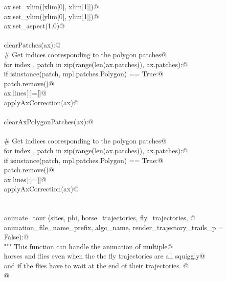 \documentclass[12.0pt]{report}
\begin{document}
\begin{appendices}
\begin{flushleft}
\begin{list}{}{}
\mbox{}\verb@      ax.set_xlim([xlim[0], xlim[1]])@\\
\mbox{}\verb@      ax.set_ylim([ylim[0], ylim[1]])@\\
\mbox{}\verb@      ax.set_aspect(1.0)@\\
\mbox{}\verb@@\\
\mbox{}\verb@def clearPatches(ax):@\\
\mbox{}\verb@    # Get indices cooresponding to the polygon patches@\\
\mbox{}\verb@    for index , patch in zip(range(len(ax.patches)), ax.patches):@\\
\mbox{}\verb@        if isinstance(patch, mpl.patches.Polygon) == True:@\\
\mbox{}\verb@            patch.remove()@\\
\mbox{}\verb@    ax.lines[:]=[]@\\
\mbox{}\verb@    applyAxCorrection(ax)@\\
\mbox{}\verb@@\\
\mbox{}\verb@def clearAxPolygonPatches(ax):@\\
\mbox{}\verb@@\\
\mbox{}\verb@    # Get indices cooresponding to the polygon patches@\\
\mbox{}\verb@    for index , patch in zip(range(len(ax.patches)), ax.patches):@\\
\mbox{}\verb@        if isinstance(patch, mpl.patches.Polygon) == True:@\\
\mbox{}\verb@            patch.remove()@\\
\mbox{}\verb@    ax.lines[:]=[]@\\
\mbox{}\verb@    applyAxCorrection(ax)@\\
\mbox{}\verb@@\\
\mbox{}\verb@@\\
\mbox{}\verb@def animate_tour (sites, phi, horse_trajectories, fly_trajectories, @\\
\mbox{}\verb@                  animation_file_name_prefix, algo_name,  render_trajectory_trails_p = False):@\\
\mbox{}\verb@    """ This function can handle the animation of multiple@\\
\mbox{}\verb@    horses and flies even when the the fly trajectories are all squiggly@\\
\mbox{}\verb@    and if the flies have to wait at the end of their trajectories. @\\
\mbox{}\verb@    @\\

\end{list}
\end{flushleft}
\end{appendices}
\end{document}
